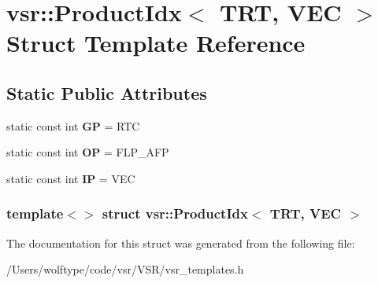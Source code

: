 \hypertarget{structvsr_1_1_product_idx_3_01_t_r_t_00_01_v_e_c_01_4}{\section{vsr\-:\-:Product\-Idx$<$ T\-R\-T, V\-E\-C $>$ Struct Template Reference}
\label{structvsr_1_1_product_idx_3_01_t_r_t_00_01_v_e_c_01_4}
}
\subsection*{Static Public Attributes}
\begin{DoxyCompactItemize}
\item 
\hypertarget{structvsr_1_1_product_idx_3_01_t_r_t_00_01_v_e_c_01_4_abd0bc2ddd4c2eaae0e4729be00f1460b}{static const int {\bfseries G\-P} = R\-T\-C}\label{structvsr_1_1_product_idx_3_01_t_r_t_00_01_v_e_c_01_4_abd0bc2ddd4c2eaae0e4729be00f1460b}

\item 
\hypertarget{structvsr_1_1_product_idx_3_01_t_r_t_00_01_v_e_c_01_4_a97a62f3a3497f67cdeb7580e9ccb22ef}{static const int {\bfseries O\-P} = F\-L\-P\-\_\-\-A\-F\-P}\label{structvsr_1_1_product_idx_3_01_t_r_t_00_01_v_e_c_01_4_a97a62f3a3497f67cdeb7580e9ccb22ef}

\item 
\hypertarget{structvsr_1_1_product_idx_3_01_t_r_t_00_01_v_e_c_01_4_af58e5ec7f5ea5739247594f896d23128}{static const int {\bfseries I\-P} = V\-E\-C}\label{structvsr_1_1_product_idx_3_01_t_r_t_00_01_v_e_c_01_4_af58e5ec7f5ea5739247594f896d23128}

\end{DoxyCompactItemize}
\subsubsection*{template$<$$>$ struct vsr\-::\-Product\-Idx$<$ T\-R\-T, V\-E\-C $>$}



The documentation for this struct was generated from the following file\-:\begin{DoxyCompactItemize}
\item 
/\-Users/wolftype/code/vsr/\-V\-S\-R/vsr\-\_\-templates.\-h\end{DoxyCompactItemize}
